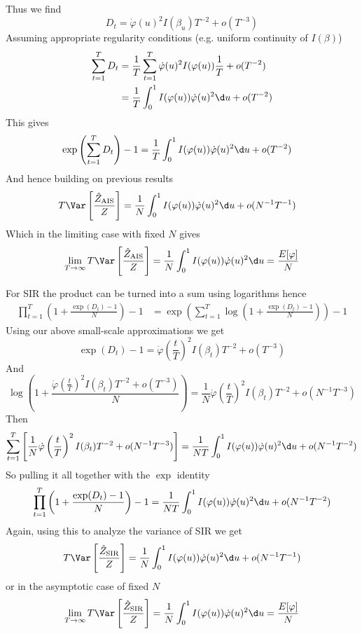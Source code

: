 \documentclass{article}
\begin{document}
\begin{enumerate}
    Thus we find
    \[
        D_t = \dot\varphi(u)^2 I(\beta_u)T^{-2} + o(T^{-3})
    \]
    Assuming appropriate regularity conditions (e.g. uniform continuity of
    $I(\beta)$)
    \begin{align}
        \sum_{t=1}^T D_t &= 
            \frac 1 T \sum_{t=1}^T \dot\varphi(u)^2 I(\varphi(u))\frac 1 T + o(T^{-2}) \\
            &= \frac 1 T \int_{0}^{1} I(\varphi(u))\dot\varphi(u)^2 \d u + o(T^{-2})
    \end{align}
    This gives 
    \begin{align}
        \exp\left(\sum_{t=1}^T D_t \right) - 1 &=
            \frac 1 T \int_{0}^{1} I(\varphi(u))\dot\varphi(u)^2 \d u + o(T^{-2}) 
    \end{align}
    And hence building on previous results
    \begin{align}
        T\Var \left[\frac{\hat Z_\AIS}{Z}\right] &= 
            \frac 1 N \int_{0}^{1} I(\varphi(u))\dot\varphi(u)^2 \d u + o(N^{-1}T^{-1})
    \end{align}
    Which in the limiting case with fixed $N$ gives
    \[
        \lim_{T \to \infty} T\Var \left[\frac{\hat Z_\AIS}{Z}\right] = 
            \frac 1 N \int_{0}^{1} I(\varphi(u))\dot\varphi(u)^2 \d u = 
            \frac{E[\varphi]}{N}
    \]

    For SIR the product can be turned into a sum using logarithms hence
    \begin{align}
        \prod_{t=1}^T \left(1 + \frac{\exp(D_t)-1}{N}\right) - 1
        &= \exp\left(\sum_{t=1}^T 
            \log\left(1 + \frac{\exp(D_t)-1}{N} \right)
            \right) - 1
    \end{align}
    Using our above small-scale approximations we get
    \[
        \exp(D_t) - 1 =  \dot\varphi\left(\frac t T\right)^2 I(\beta_t)T^{-2} + o(T^{-3})
    \]
    And 
    \[
        \log\left( 1 + \frac{\dot\varphi\left(\frac t T\right)^2 I(\beta_t)T^{-2} + o(T^{-3})}{N}\right) = 
        \frac 1 N\dot\varphi\left(\frac t T\right)^2 I(\beta_t)T^{-2} + o(N^{-1}T^{-3})
    \]
    Then
    \[
        \sum_{t=1}^T
             \left[ \frac 1 N\dot\varphi\left(\frac t T\right)^2 I(\beta_t)T^{-2} + o(N^{-1}T^{-3})\right]
            =  \frac 1 {NT} \int_0^1 I(\varphi(u))\dot\varphi(u)^2 \d u
                + o(N^{-1}T^{-2})
    \]
    So pulling it all together with the $\exp$ identity
    \[
        \prod_{t=1}^T \left(1 + \frac{\exp(D_t)-1}{N}\right) - 1 =
         \frac 1 {NT} \int_0^1 I(\varphi(u))\dot\varphi(u)^2 \d u
                + o(N^{-1}T^{-2}) 
    \]
    Again, using this to analyze the variance of SIR we get
    \[
        T\Var \left[ \frac{\hat Z_\SIR}{Z} \right] = 
         \frac 1 {N} \int_0^1 I(\varphi(u))\dot\varphi(u)^2 \d u
                + o(N^{-1}T^{-1})
    \]
    or in the asymptotic case of fixed $N$
    \[
        \lim_{T \to \infty} T\Var \left[ \frac{\hat Z_\SIR}{Z} \right] = 
         \frac 1 {N} \int_0^1 I(\varphi(u))\dot\varphi(u)^2 \d u = 
         \frac{E[\varphi]}{N} 
    \]
    

\end{enumerate}
\end{document}
